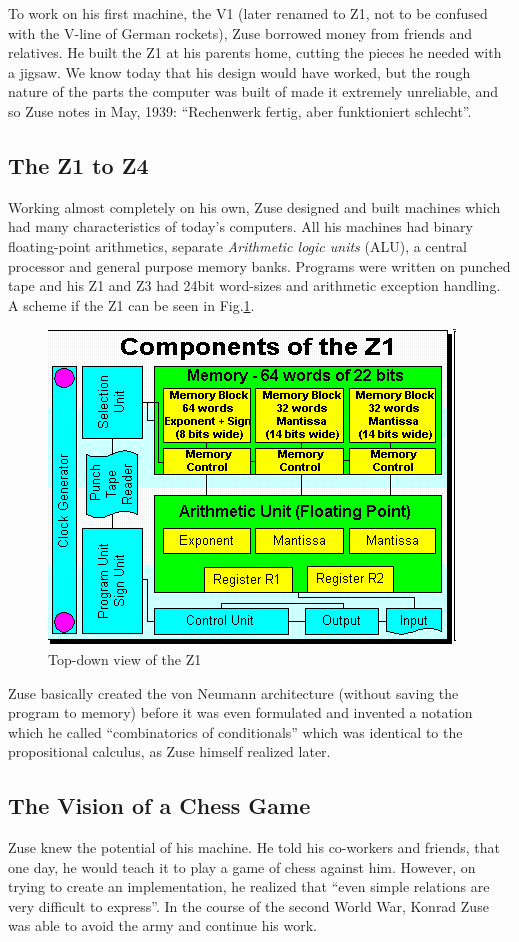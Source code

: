 \documentclass{llncs}
\begin{document}
   To work on his first machine, the V1 (later renamed to Z1, not to be 
   confused with the V-line of German rockets), Zuse borrowed money
   from friends and relatives. He built the Z1 at his parents home, cutting the 
   pieces he needed with a jigsaw. We know today that his design would have worked,
   but the rough nature of the parts the computer was built of made it extremely unreliable,
   and so Zuse notes in May, 1939: ``Rechenwerk fertig, aber funktioniert schlecht''\cite{rojas2002plankalkuel}.
 \subsection{The Z1 to Z4}
   Working almost completely on his own, Zuse designed and built machines 
   which had many characteristics of today's computers. All his machines
   had binary floating-point arithmetics, separate \emph{Arithmetic logic units} (ALU), 
   a central processor and general purpose memory banks.
   Programs were written on punched tape and his Z1 and Z3 had 24bit word-sizes
   and arithmetic exception handling. A scheme if the Z1 can be seen in Fig.\ref{fig:z1}.
   
  \begin{figure}[t]
    \centering
    \includegraphics[width=0.5\linewidth]{img/z1.png}
    \caption{Top-down view of the Z1\cite{epegmagHorstzuse}}
    \label{fig:z1}
  \end{figure}

   Zuse basically created the von Neumann architecture (without saving the program to memory)
   before it was even formulated\cite{epegmagHorstzuse} 
   and invented a notation which he called ``combinatorics of conditionals'' which was
   identical to the propositional calculus, as Zuse himself realized later.
 \subsection{The Vision of a Chess Game}
   Zuse knew the potential of his machine. He told his co-workers and 
   friends, that one day, he would teach it to play a game of chess 
   against him. However, on trying to create an implementation, he realized 
   that ``even simple relations are very difficult to express''. In the course
   of the second World War, Konrad Zuse was able to avoid the army and 
   continue his work. 
   
\end{document}
